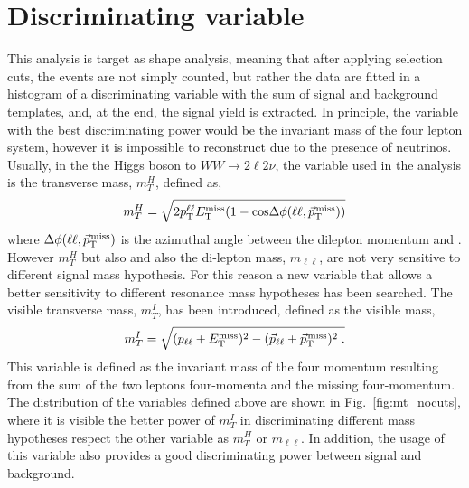 \section{Discriminating variable}
This analysis is target as shape analysis, meaning that after applying selection cuts, the events are not simply counted, but rather the data are fitted in a  histogram of a discriminating variable with the sum of signal and background templates, and, at the end,  the signal yield is extracted.
In principle, the variable with the best discriminating power would be the invariant mass of
the four lepton system, however it is impossible to reconstruct  due to the presence of neutrinos.
Usually,  in the the Higgs boson to $WW \to 2\ell 2\nu $, the variable used in the analysis is the transverse mass, $m_T^H$, defined as,  
\begin{equation}
 m_T^H = \sqrt{2p_{\rm T}^{\ell\ell}E_{\mathrm{T}}^{\text{miss}}(1-\mathrm{cos}\Delta\phi(\ell\ell, {\vec p}_{\mathrm{T}}^{\kern1pt\text{miss}}))}
\end{equation}
where $\Delta\phi(\ell\ell, {\vec p}_{\mathrm{T}}^{\kern1pt\text{miss}})$ is the azimuthal angle between the dilepton momentum and \ptvecmiss.
However  $m_T^H$ but also and also the di-lepton mass, $m_{\ell \ell}$, are not very sensitive to different
signal mass hypothesis. For this reason a new variable that allows a better sensitivity to different resonance mass hypotheses has been searched. 
The visible transverse mass,  $m_T^I$, has been introduced,  defined as the visible mass,
\begin{equation}
 m_T^I = \sqrt{ (p_\mathrm{\ell\ell} + E_{\mathrm{T}}^{\text{miss}})^2 - (\vec{p}_\mathrm{\ell\ell} + {\vec p}_{\mathrm{T}}^{\kern1pt\text{miss}})^2 \; .}
\end{equation}
 This variable is defined as the invariant mass of the four momentum resulting from the sum of the
two leptons four-momenta and the missing four-momentum. 
The distribution of the variables defined above are shown in
Fig.~\ref{fig:mt_nocuts}, where it is visible the better power of $m_T^I$ in discriminating different mass hypotheses respect the other variable as  $m_T^H$ or $m_{\ell \ell}$. In addition, the usage of this variable also provides a good discriminating power between signal and background.
